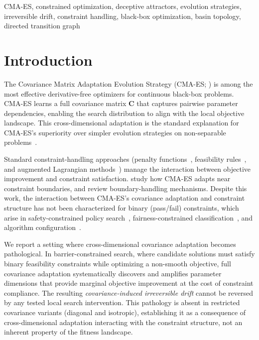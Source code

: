 \documentclass[twoside]{article}
\newcommand{\bC}{\mathbf{C}}
\begin{document}
\begin{keywords}
  CMA-ES, constrained optimization, deceptive attractors, evolution strategies,
  irreversible drift, constraint handling, black-box optimization,
  basin topology, directed transition graph
\end{keywords}

\section{Introduction}
\label{sec:intro}

The Covariance Matrix Adaptation Evolution Strategy (CMA-ES;
\citet{hansen2001completely,hansen2016cma}) is among the most effective
derivative-free optimizers for continuous black-box problems. CMA-ES
learns a full covariance matrix $\bC$ that captures pairwise parameter
dependencies, enabling the search distribution to align with the local
objective landscape. This cross-dimensional adaptation is the standard explanation for
CMA-ES's superiority over simpler evolution strategies on non-separable
problems~\citep{hansen2003reducing,ros2008simple}.

Standard constraint-handling approaches (penalty functions~\citep{smith1997penalty},
feasibility rules~\citep{deb2000efficient}, and augmented Lagrangian
methods~\citep{atamna2016augmented}) manage the interaction between objective
improvement and constraint satisfaction. \citet{arnold2012cmaes} study how
CMA-ES adapts near constraint boundaries, and
\citet{kramer2010cmaes} review boundary-handling mechanisms. Despite this
work, the interaction between CMA-ES's covariance adaptation and constraint
structure has not been characterized for binary (pass/fail) constraints,
which arise in safety-constrained policy search~\citep{garciarl2015safe},
fairness-constrained classification~\citep{agarwal2018fairness}, and algorithm
configuration~\citep{hutter2011smac}.

We report a setting where cross-dimensional covariance adaptation becomes
pathological. In barrier-constrained search, where candidate solutions must
satisfy binary feasibility constraints while optimizing a non-smooth
objective, full covariance adaptation systematically discovers and amplifies
parameter dimensions that provide marginal objective improvement at the cost
of constraint compliance. The resulting \emph{covariance-induced irreversible
drift} cannot be reversed by any tested local search intervention. This
pathology is absent in restricted covariance variants (diagonal and isotropic),
establishing it as a consequence of cross-dimensional adaptation interacting
with the constraint structure, not an inherent property of the fitness
landscape.
\end{document}
